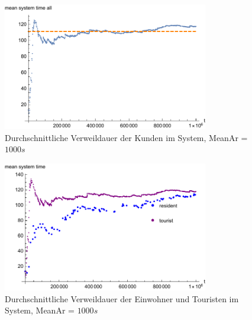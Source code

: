 \begin{figure}[htpb]
	\centering
	\includegraphics[width=0.8\textwidth]{abbildungen/1_Phone_VIP/Arrival_1000_Serve_100_dur_1000000_Skip_0/MeanSystemTimeAll.pdf}
	\caption{Durchschnittliche Verweildauer der Kunden im System, MeanAr = $1000s$}
	\label{fig:MSTVIP1000ALL}
\end{figure} 

\begin{figure}[htpb]
	\centering
	\includegraphics[width=0.8\textwidth]{abbildungen/1_Phone_VIP/Arrival_1000_Serve_100_dur_1000000_Skip_0/MeanSystemTimeTouristAndResident.pdf}
	\caption{Durchschnittliche Verweildauer der Einwohner und Touristen im System, MeanAr = $1000s$}
	\label{fig:MSTVIP1000VGL}
\end{figure}


